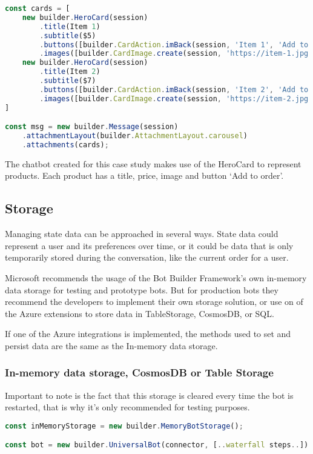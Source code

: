 \begin{lstlisting}[language=JavaScript,caption={Example of how to construct some HeroCards and display them in a carousel},label={listing:send-hero-card}]
const cards = [
	new builder.HeroCard(session)
		.title(Item 1)
		.subtitle($5)
		.buttons([builder.CardAction.imBack(session, 'Item 1', 'Add to order')])
		.images([builder.CardImage.create(session, 'https://item-1.jpg')])),
	new builder.HeroCard(session)
		.title(Item 2)
		.subtitle($7)
		.buttons([builder.CardAction.imBack(session, 'Item 2', 'Add to order')])
		.images([builder.CardImage.create(session, 'https://item-2.jpg')])),
]

const msg = new builder.Message(session)
	.attachmentLayout(builder.AttachmentLayout.carousel)
	.attachments(cards);
\end{lstlisting}

The chatbot created for this case study makes use of the HeroCard to represent products. Each product has a title, price, image and button `Add to order'.

\subsection{Storage}

Managing state data can be approached in several ways. State data could represent a user and its preferences over time, or it could be data that is only temporarily stored during the conversation, like the current order for a user.

Microsoft recommends the usage of the Bot Builder Framework's own in-memory data storage for testing and prototype bots. But for production bots they recommend the developers to implement their own storage solution, or use on of the Azure extensions to store data in \Gls{TableStorage}\cite{table-storage}, \Gls{CosmosDB}\cite{cosmosdb}, or SQL.

If one of the Azure integrations is implemented, the methods used to set and persist data are the same as the In-memory data storage.

\subsubsection{In-memory data storage, CosmosDB or Table Storage}

Important to note is the fact that this storage is cleared every time the bot is restarted, that is why it's only recommended for testing purposes.

\begin{lstlisting}[language=JavaScript,caption={Example on how to set up the in-memory data storage},label={listing:in-memory-storage}]
const inMemoryStorage = new builder.MemoryBotStorage();

const bot = new builder.UniversalBot(connector, [..waterfall steps..]).set('storage', inMemoryStorage);
\end{lstlisting}

